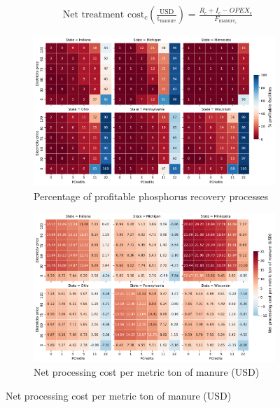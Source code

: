 \begin{refsection}[referencesCh5]
\begin{align}
& \text{Net treatment cost}_c \left(\frac{\text{USD}}{\text{t}_{\text{manure}}}\right) = \frac{R_{c} + I_{c} - OPEX_{c}}{F_{\text{manure}_{c}}} \label{eq:NetTreatCost}
\end{align}

\begin{figure}[h!]
	\centering
	\begin{subfigure}[t]{\textwidth}
		\centering
		\includegraphics[width=\linewidth]{gfx/Chapter5/DataAnalysisProfitable.pdf} 
		\caption{Percentage of profitable phosphorus recovery processes}
		\label{fig:PercProfitableStates_AllScenarios}
	\end{subfigure}
	\par\bigskip
	\begin{subfigure}[t]{\textwidth}
		\centering
		\includegraphics[width=\linewidth]{gfx/Chapter5/TAC_tonManure.pdf}
		\caption{Net processing cost per metric ton of manure (USD)}
		\label{fig:TAC_kgManure_AllScenarios}
	\end{subfigure}
	

\end{figure}
\end{refsection}
